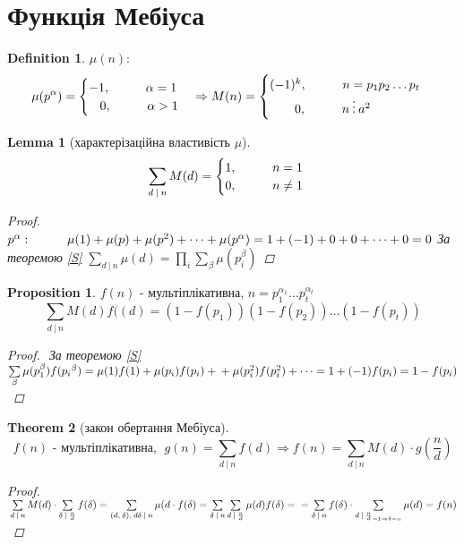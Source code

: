 \documentclass[a4paper,12pt]{bookest}
\newtheorem{theorem}{Theorem}[section]
\newtheorem{lemma}[theorem]{Lemma}
\newtheorem{definition}{Definition}[section]
\newtheorem*{prop*}{Proposition}
\newcommand\tab[1][1cm]{\hspace*{#1}}
\begin{document}
\section{Функція Мебіуса}
\begin{definition}
	$\mu(n):$ $$\mu(p^\alpha)=\begin{cases}
		-1,\tab \alpha=1\\\>\>\>\>0,\tab\alpha>1
	\end{cases}\Rightarrow M(n)=\begin{cases}
		(-1)^k,\tab n=p_1p_2\dots p_t\\\>\>\>\>\>\>\>\>\>0,\tab n\>\vdots\>a^2
	\end{cases}$$
\end{definition}
\begin{lemma}[характерізаційна властивість $\mu$]
	$$\sum\limits_{d\>|\>n}M(d)=\begin{cases}
		1,\tab n=1\\0,\tab n\neq 1
	\end{cases}$$
	\begin{proof}
		$\\p^\alpha:\tab \mu(1)+\mu(p)	+\mu(p^2)+\dots+\mu(p^\alpha)=1+(-1)+0+0+\dots+0=0\\$ За теоремою \ref{S} $\sum\limits_{d\>|\>n}\mu(d)=\prod\limits_{i}\sum\limits_{\beta}\mu(p_i^\beta)$
	\end{proof}
\end{lemma}
\begin{prop*}
$f(n)\textrm{ - мультіплікативна, }n=p_1^{\alpha_1}\dots p_t^{\alpha_t}$
$$\sum\limits_{d\>|\>n}M(d)f((d)=(1-f(p_1))(1-f(p_2))\dots(1-f(p_t))$$
\begin{proof}$ $
	За теоремою \ref{S} $\sum\limits_{\beta}\mu(p_1^{\beta})f(p_i{^\beta})=\mu(1)f(1)+\mu(p_i)f(p_i)+\\+\mu(p_i^2)f(p_i^2)+\dots=1+(-1)f(p_i)=1-f(p_i)$
\end{proof}
\end{prop*}
\begin{theorem}[закон обертання Мебіуса]
	$$f(n) \textrm{ - мультіплікативна},\>\>g(n)	=\sum\limits_{d\>|\>n}f(d)\Rightarrow f(n)=\sum\limits_{d\>|\>n}M(d)\cdot g(\frac nd)$$
	\begin{proof}
		$\\\sum\limits_{d\>|\>n}M(d)\cdot\sum\limits_{\delta\>|\>\frac nd}f(\delta)=\sum\limits_{(d,\>\delta),\>d\delta\>|\>n}\mu(	d\cdot f(\delta)=\sum\limits_{\delta\>|\>n}\sum\limits_{d\>|\>\frac nd}\mu(d)f(\delta)=\\=\sum\limits_{\delta\>|\>n}f(\delta)\cdot\sum\limits_{d\>|\>\frac nd_{=1\Rightarrow\delta=n}}\mu(d)=f(n)$
	\end{proof}
\end{theorem}\newpage
\end{document}
